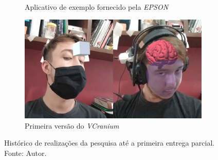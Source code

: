 \begin{figure}[ht]
\begin{subfigure}{0.45\textwidth}
        \caption{Aplicativo de exemplo fornecido pela \textit{EPSON}}
        \label{fig:papercar}
    \end{subfigure}
    \begin{subfigure}{0.45\textwidth}
        \includegraphics[width=.95\linewidth]{figuras/VCranium.png}
        \caption{Primeira versão do \textit{VCranium}}
        \label{fig:vcranium_alpha}
    \end{subfigure}
    \caption{Histórico de realizações da pesquisa até a primeira entrega parcial. Fonte: Autor.}
    \label{fig:historico}
\end{figure}



